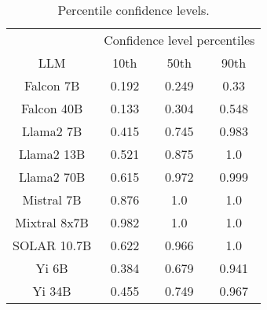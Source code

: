 \begin{table*}
\centering
\begin{tabular}{c|c|c|c}
& \multicolumn{3}{c}{Confidence level percentiles} \\ 
LLM & 10th & 50th & 90th\\ \hline
Falcon 7B & 0.192 & 0.249 & 0.33\\
Falcon 40B & 0.133 & 0.304 & 0.548\\
Llama2 7B & 0.415 & 0.745 & 0.983\\
Llama2 13B & 0.521 & 0.875 & 1.0\\
Llama2 70B & 0.615 & 0.972 & 0.999\\
Mistral 7B & 0.876 & 1.0 & 1.0\\
Mixtral 8x7B & 0.982 & 1.0 & 1.0\\
SOLAR 10.7B & 0.622 & 0.966 & 1.0\\
Yi 6B & 0.384 & 0.679 & 0.941\\
Yi 34B & 0.455 & 0.749 & 0.967\\
\hline
\end{tabular}
\caption{Percentile confidence levels.}
\label{tab:percentile_conf}
\end{table*}
